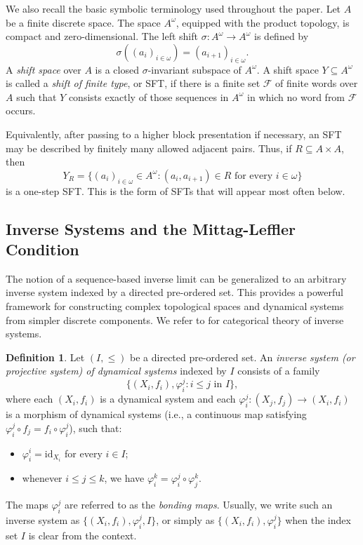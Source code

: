 \documentclass[12pt]{amsart}
\theoremstyle{definition}
\newtheorem{definition}[theorem]{Definition}
\numberwithin{equation}{section}
\theoremstyle{remark}
\begin{document}
We also recall the basic symbolic terminology used throughout the paper. Let
$A$ be a finite discrete space. The space $A^\omega$, equipped with the product
topology, is compact and zero-dimensional. The left shift
$\sigma:A^\omega\to A^\omega$ is defined by
\[
    \sigma((a_i)_{i\in\omega})=(a_{i+1})_{i\in\omega}.
\]
A \emph{shift space} over $A$ is a closed $\sigma$-invariant subspace of
$A^\omega$. A shift space $Y\subseteq A^\omega$ is called a \emph{shift of
finite type}, or SFT, if there is a finite set $\mathcal F$ of finite words over
$A$ such that $Y$ consists exactly of those sequences in $A^\omega$ in which no
word from $\mathcal F$ occurs.

Equivalently, after passing to a higher block presentation if necessary, an SFT
may be described by finitely many allowed adjacent pairs. Thus, if
$R\subseteq A\times A$, then
\[
    Y_R=\{(a_i)_{i\in\omega}\in A^\omega:(a_i,a_{i+1})\in R
    \text{ for every }i\in\omega\}
\]
is a one-step SFT. This is the form of SFTs that will appear most often below.

\subsection{Inverse Systems and the Mittag-Leffler Condition}
The notion of a sequence-based inverse limit can be generalized to an arbitrary inverse system indexed by a directed pre-ordered set. This provides a powerful framework for constructing complex topological spaces and dynamical systems from simpler discrete components. We refer to \cite{MSeg} for categorical theory of inverse systems.

\begin{definition}
Let $(I,\le)$ be a directed pre-ordered set. An \emph{inverse system (or projective system) of dynamical systems} indexed by $I$ consists of a family
\[
\{(X_i,f_i),\varphi_i^j : i\le j \text{ in } I\},
\]
where each $(X_i,f_i)$ is a dynamical system and each $\varphi_i^j:(X_j,f_j)\to (X_i,f_i)$ is a morphism of dynamical systems (i.e., a continuous map satisfying $\varphi_i^j \circ f_j = f_i \circ \varphi_i^j$), such that:
\begin{itemize}
\item $\varphi_i^i=\mathrm{id}_{X_i}$ for every $i\in I$;
\item whenever $i\le j\le k$, we have $\varphi_i^k = \varphi_i^j\circ \varphi_j^k$.
\end{itemize}
The maps $\varphi_i^j$ are referred to as the \emph{bonding maps}. Usually, we write such an inverse system as $\{(X_i,f_i),\varphi_i^j,I\}$, or simply as $\{(X_i,f_i),\varphi_i^j\}$ when the index set $I$ is clear from the context.
\end{definition}
\end{document}
